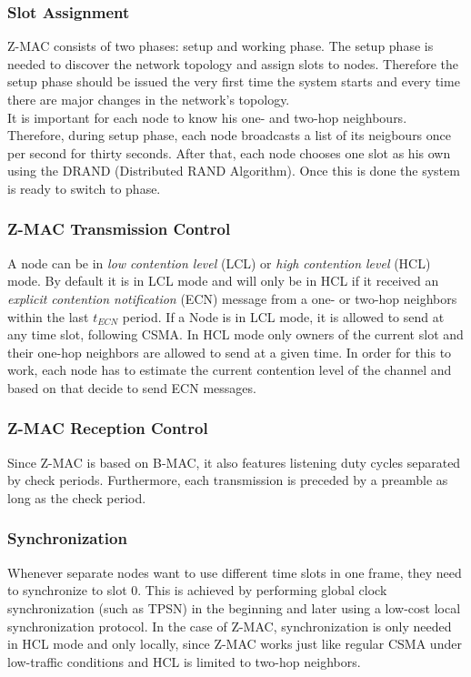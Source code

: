 \subsubsection{Slot Assignment}
Z-MAC consists of two phases: setup and working phase. The setup phase is needed to discover the network topology and assign slots to nodes. Therefore the setup phase should be issued the very first time the system starts and every time there are major changes in the network's topology.\\
It is important for each node to know his one- and two-hop neighbours. Therefore, during setup phase, each node broadcasts a list of its neigbours once per second for thirty seconds. After that, each node chooses one slot as his own using the DRAND (Distributed RAND Algorithm). Once this is done the system is ready to switch to
phase.

\subsubsection{Z-MAC Transmission Control}
A node can be in \textit{low contention level} (LCL) or \textit{high contention level} (HCL) mode. By default it is in LCL mode and will only be in HCL if it received an \textit{explicit contention notification} (ECN) message from a one- or two-hop neighbors within the last $t_{ECN}$ period. If a Node is in LCL mode, it is allowed to send at any time slot, following CSMA. In HCL mode only owners of the current slot and their one-hop neighbors are allowed to send at a given time. In order for this to work, each node has to estimate the current contention level of the channel and based on that decide to send ECN messages.

\subsubsection{Z-MAC Reception Control}
Since Z-MAC is based on B-MAC, it also features listening duty cycles separated by check periods. Furthermore, each transmission is preceded by a preamble as long as the check period.

\subsubsection{Synchronization}
Whenever separate nodes want to use different time slots in one frame, they need to synchronize to slot 0. This is achieved by performing global clock synchronization (such as TPSN) in the beginning and later using a low-cost local synchronization protocol. In the case of Z-MAC, synchronization is only needed in HCL mode and only locally, since Z-MAC works just like regular CSMA under low-traffic conditions and HCL is limited to two-hop neighbors.
